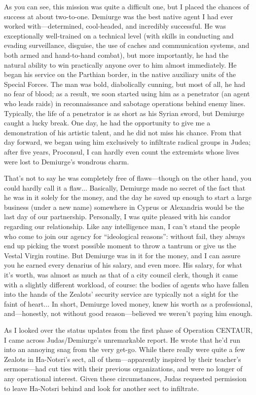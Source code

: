 As you can see, this mission was quite a difficult one, but I placed the chances of success at about two-to-one. Demiurge was the best native agent I had ever worked with---determined, cool-headed, and incredibly successful. He was exceptionally well-trained on a technical level (with skills in conducting and evading surveillance, disguise, the use of caches and communication systems, and both armed and hand-to-hand combat), but more importantly, he had the natural ability to win practically anyone over to him almost immediately. He began his service on the Parthian border, in the native auxiliary units of the Special Forces. The man was bold, diabolically cunning, but most of all, he had no fear of blood; as a result, we soon started using him as a penetrator (an agent who leads raids) in reconnaissance and sabotage operations behind enemy lines. Typically, the life of a penetrator is as short as his Syrian sword, but Demiurge caught a lucky break. One day, he had the opportunity to give me a demonstration of his artistic talent, and he did not miss his chance. From that day forward, we began using him exclusively to infiltrate radical groups in Judea; after five years, Proconsul, I can hardly even count the extremists whose lives were lost to Demiurge's wondrous charm.

That's not to say he was completely free of flaws---though on the other hand, you could hardly call it a flaw... Basically, Demiurge made no secret of the fact that he was in it solely for the money, and the day he saved up enough to start a large business (under a new name) somewhere in Cyprus or Alexandria would be the last day of our partnership. Personally, I was quite pleased with his candor regarding our relationship. Like any intelligence man, I can't stand the people who come to join our agency for ``ideological reasons'': without fail, they always end up picking the worst possible moment to throw a tantrum or give us the Vestal Virgin routine. But Demiurge was in it for the money, and I can assure you he earned every denarius of his salary, and even more. His salary, for what it's worth, was almost as much as that of a city council clerk, though it came with a slightly different workload, of course: the bodies of agents who have fallen into the hands of the Zealots' security service are typically not a sight for the faint of heart... In short, Demiurge loved money, knew his worth as a professional, and---honestly, not without good reason---believed we weren't paying him enough.

As I looked over the status updates from the first phase of Operation CENTAUR, I came across Judas/Demiurge's unremarkable report. He wrote that he'd run into an annoying snag from the very get-go. While there really were quite a few Zealots in Ha-Notsri's sect, all of them---apparently inspired by their teacher's sermons---had cut ties with their previous organizations, and were no longer of any operational interest. Given these circumstances, Judas requested permission to leave Ha-Notsri behind and look for another sect to infiltrate.

